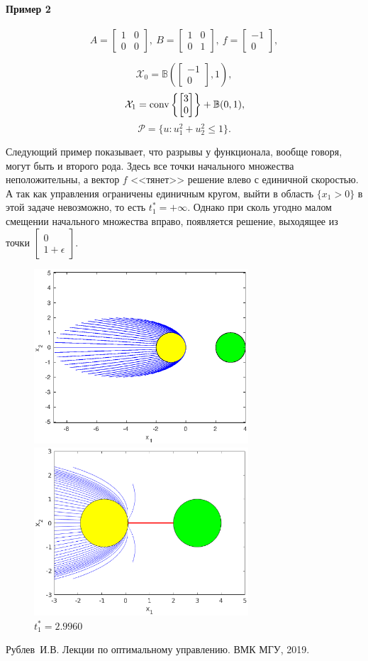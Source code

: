 \documentclass[11pt]{article}
\newcommand\PS{\mathcal{P}}
\newcommand\X{\mathcal{X}}
\newcommand\Cl[2]{\begin{bmatrix}
#1 \\ #2
\end{bmatrix}}
\newcommand\Conv[1]{{\rm conv}\left\{ #1 \right\}}
\begin{document}
\paragraph{Пример 2\\}
\begin{equation}
A = \begin{bmatrix}
1 & 0 \\ 0 & 0
\end{bmatrix},\ 
B = \begin{bmatrix}
1 & 0 \\ 0 & 1
\end{bmatrix}, \
f = \begin{bmatrix}
-1 \\ 0
\end{bmatrix},
\end{equation}

$$\X_0 = \mathbb{B}\left(\Cl{-1}{0}, 1\right), $$
$$\X_1 = \Conv{\Cl{3}{0}} + \mathbb{B}(0, 1),$$
$$\PS = \{u\colon u_1^2 + u_2^2 \le 1\}.$$

Следующий пример показывает, что разрывы у функционала, вообще говоря, могут быть и второго рода.
Здесь все точки начального множества неположительны, а вектор $f$ <<тянет>> решение влево с единичной
скоростью. А так как управления ограничены единичным кругом, выйти в область $\{x_1 > 0\}$ в
этой задаче невозможно, то есть $t_1^* = +\infty$. Однако при сколь угодно малом смещении начального
множества вправо, появляется решение, выходящее из точки $\Cl{0}{1+\epsilon}$.
\begin{figure}[h]
\begin{multicols}{2}
	\hfill
	\includegraphics[width=80mm]{4_1.eps}
	\hfill
	\caption{$t_1^* = +\infty$}
	\hfill
	\includegraphics[width=80mm]{4_2.eps}
	\hfill
	\caption{$t_1^* = 2.9960$}
\end{multicols}
\end{figure}


\begin{thebibliography}{0}
	Рублев~И.В. Лекции по оптимальному управлению. ВМК МГУ, 2019. 
\end{thebibliography}
\end{document}
